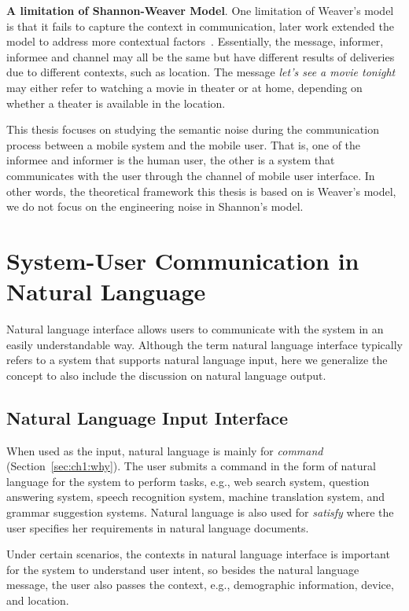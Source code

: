 \textbf{A limitation of Shannon-Weaver Model}. One limitation of Weaver's model is that it fails to capture the context in communication, later work extended the model to address more contextual factors~\cite{chandler1994transmission}. Essentially, the message, informer, informee and channel may all be the same but have different results of deliveries due to different contexts, such as location. The message \textit{let's see a movie tonight} may either refer to watching a movie in theater or at home, depending on whether a theater is available in the location. 

This thesis focuses on studying the semantic noise during the communication process between a mobile system and the mobile user. That is, one of the informee and informer is the human user, the other is a system that communicates with the user through the channel of mobile user interface. In other words, the theoretical framework this thesis is based on is Weaver's model, we do not focus on the engineering noise in Shannon's model. 

\section{System-User Communication in Natural Language}

Natural language interface allows users to communicate with the system in an easily understandable way. Although the term natural language interface typically refers to a system that supports natural language input, here we generalize the concept to also include the discussion on natural language output. 

\subsection{Natural Language Input Interface}

When used as the input, natural language is mainly for \textit{command} (Section~\ref{sec:ch1:why}). The user submits a command in the form of natural language for the system to perform tasks, e.g., web search system, question answering system, speech recognition system, machine translation system, and grammar suggestion systems. Natural language is also used for \textit{satisfy} where the user specifies her requirements in natural language documents. 

Under certain scenarios, the contexts in natural language interface is important for the system to understand user intent, so besides the natural language message, the user also passes the context, e.g., demographic information, device, and location. 

